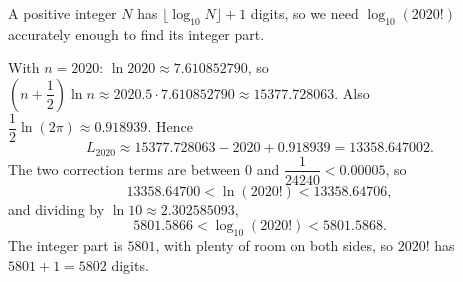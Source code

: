 A positive integer $N$ has $\lfloor\log_{10}N\rfloor+1$ digits, so we need $\log_{10}(2020!)$ accurately enough to find its integer part.

With $n=2020$: $\ln2020\approx7.610852790$, so $\left(n+\dfrac12\right)\ln n\approx2020.5\cdot7.610852790\approx15377.728063$. Also $\dfrac12\ln(2\pi)\approx0.918939$. Hence
\[L_{2020}\approx15377.728063-2020+0.918939=13358.647002.\]
The two correction terms are between $0$ and $\dfrac{1}{24240}<0.00005$, so
\[13358.64700<\ln(2020!)<13358.64706,\]
and dividing by $\ln10\approx2.302585093$,
\[5801.5866<\log_{10}(2020!)<5801.5868.\]
The integer part is $5801$, with plenty of room on both sides, so $2020!$ has $5801+1=\boxed{5802}$ digits.
